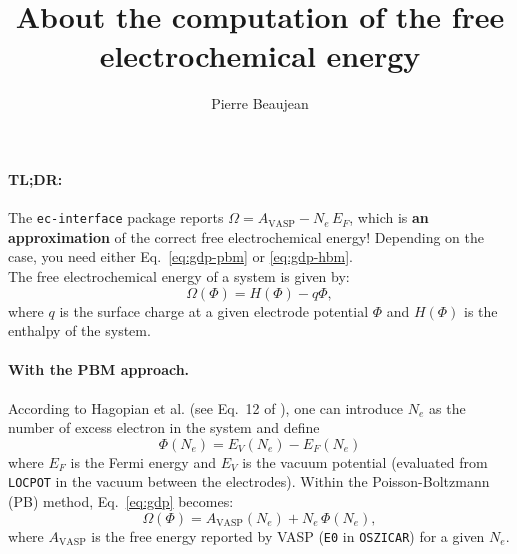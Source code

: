 \documentclass[12pt,a4paper]{article}
\title{About the computation of the free electrochemical energy}
\author{Pierre Beaujean}
\begin{document}
	\maketitle
	
	\paragraph{TL;DR:} The \texttt{ec-interface} package reports $\Omega = A_{\text{VASP}} - N_e\,E_F$, which is \textbf{an approximation} of the correct free electrochemical energy! Depending on the case, you need either Eq.~\eqref{eq:gdp-pbm} or \eqref{eq:gdp-hbm}.\\
	
	The free electrochemical energy of a system is given by:\begin{equation}
		\Omega(\Phi) = H(\Phi) - q\Phi,\label{eq:gdp}
	\end{equation}
	where $q$ is the surface charge at a given electrode potential $\Phi$ and $H(\Phi)$ is the enthalpy of the system.
	
	\paragraph{With the PBM approach.} According to Hagopian et al. (see Eq.~12 of \cite{hagopianAdvancementHomogeneousBackground2022}), one can introduce $N_e$ as the number of excess electron in the system and define\begin{equation}
		\Phi(N_e) = E_V(N_e)-E_F(N_e)
	\end{equation} 
	where $E_F$ is the Fermi energy and $E_V$ is the vacuum potential (evaluated from \texttt{LOCPOT} in the vacuum between the electrodes). Within the Poisson-Boltzmann (PB) method, Eq.~\eqref{eq:gdp} becomes:\begin{equation}
		\Omega(\Phi) = A_{\text{VASP}}(N_e) + N_e\,\Phi(N_e), \label{eq:gdp-pbm}
	\end{equation}
	where $A_{\text{VASP}}$ is the free energy reported by VASP (\texttt{E0} in \texttt{OSZICAR}) for a given $N_e$.
	
\end{document}
